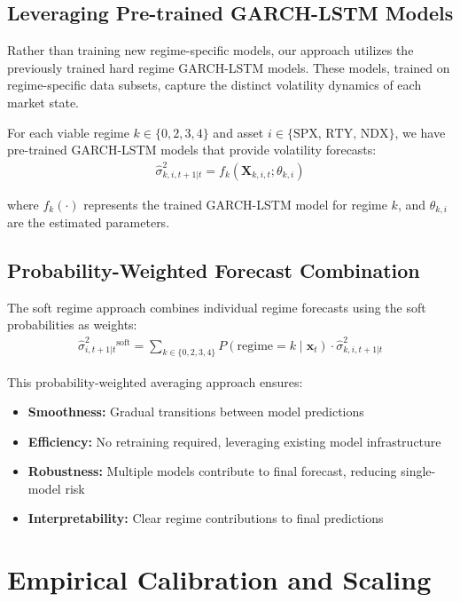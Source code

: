 \subsection{Leveraging Pre-trained GARCH-LSTM Models}

Rather than training new regime-specific models, our approach utilizes the previously trained hard regime GARCH-LSTM models. These models, trained on regime-specific data subsets, capture the distinct volatility dynamics of each market state.

For each viable regime $k \in \{0,2,3,4\}$ and asset $i \in \{\text{SPX, RTY, NDX}\}$, we have pre-trained GARCH-LSTM models that provide volatility forecasts:
\begin{align}
\hat{\sigma}^2_{k,i,t+1|t} = f_k(\mathbf{X}_{k,i,t}; \theta_{k,i})
\end{align}

where $f_k(\cdot)$ represents the trained GARCH-LSTM model for regime $k$, and $\theta_{k,i}$ are the estimated parameters.

\subsection{Probability-Weighted Forecast Combination}

The soft regime approach combines individual regime forecasts using the soft probabilities as weights:
\begin{align}
\hat{\sigma}^2_{i,t+1|t}^{\text{soft}} = \sum_{k \in \{0,2,3,4\}} P(\text{regime}=k \mid \mathbf{x}_t) \cdot \hat{\sigma}^2_{k,i,t+1|t}
\end{align}

This probability-weighted averaging approach ensures:
\begin{itemize}
    \item \textbf{Smoothness:} Gradual transitions between model predictions
    \item \textbf{Efficiency:} No retraining required, leveraging existing model infrastructure  
    \item \textbf{Robustness:} Multiple models contribute to final forecast, reducing single-model risk
    \item \textbf{Interpretability:} Clear regime contributions to final predictions
\end{itemize}

\section{Empirical Calibration and Scaling}

